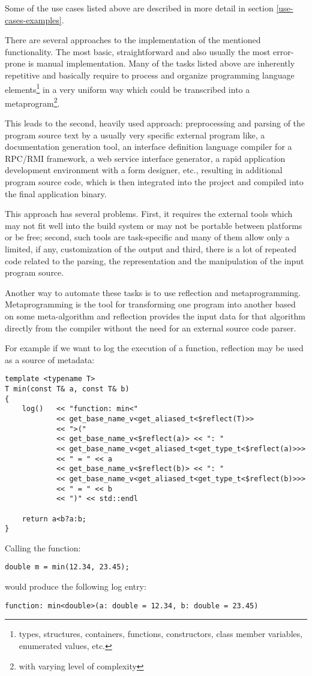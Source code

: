 Some of the use cases listed above are described in more detail in section
\ref{use-cases-examples}.

There are several approaches to the implementation of the mentioned functionality.
The most basic, straightforward and also usually the most
error-prone is manual implementation. Many of the tasks listed above
are inherently repetitive and basically require to process and organize
programming language elements\footnote{types, structures, containers, functions,
constructors, class member variables, enumerated values, etc.}
in a very uniform way which could be transcribed into a metaprogram\footnote{with
varying level of complexity}.

This leads to the second, heavily used approach: preprocessing
and parsing of the program source text by a usually very specific external
program like, a documentation generation tool, an interface definition language
compiler for a RPC/RMI framework, a web service interface generator,
a rapid application development environment with a form designer, etc.,
resulting in additional program source code, which is then integrated into
the project and compiled into the final application binary.

This approach has several problems. First, it requires the external
tools which may not fit well into the build system or may not be portable
between platforms or be free; second, such tools are task-specific
and many of them allow only a limited, if any, customization of the output
and third, there is a lot of repeated code related to the parsing, the
representation and the manipulation of the input program source.

Another way to automate these tasks is to use reflection and metaprogramming.
Metaprogramming is the tool for transforming one program into another based
on some meta-algorithm and reflection provides the input data for that algorithm
directly from the compiler without the need for an external source code parser.

For example if we want to log the execution of a function, reflection may
be used as a source of metadata:

\begin{verbatim}
template <typename T>
T min(const T& a, const T& b)
{
	log()   << "function: min<"
	        << get_base_name_v<get_aliased_t<$reflect(T)>>
	        << ">("
	        << get_base_name_v<$reflect(a)> << ": "
	        << get_base_name_v<get_aliased_t<get_type_t<$reflect(a)>>>
	        << " = " << a
	        << get_base_name_v<$reflect(b)> << ": "
	        << get_base_name_v<get_aliased_t<get_type_t<$reflect(b)>>>
	        << " = " << b
	        << ")" << std::endl

	return a<b?a:b;
}
\end{verbatim}

Calling the \verb@min@ function:

\begin{verbatim}
double m = min(12.34, 23.45);
\end{verbatim}

would produce the following log entry:

\begin{verbatim}
function: min<double>(a: double = 12.34, b: double = 23.45)
\end{verbatim}


